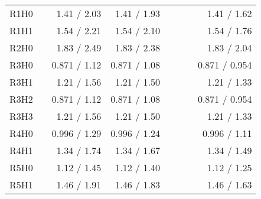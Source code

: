 \begin{table}[hb]
\begin{centering}
{\begin{tabular}{|l|l|r|r|r|r|r|r|}
R1H0                            &                                                                       &    1.41 / 2.03 &   1.41 / 1.93 &               &               &               &   1.41 / 1.62 \\
R1H1                            &                                                                       &    1.54 / 2.21 &   1.54 / 2.10 &               &               &               &   1.54 / 1.76 \\
R2H0                            &                                                                       &    1.83 / 2.49 &   1.83 / 2.38 &               &               &               &   1.83 / 2.04 \\
R3H0                            &                                                                       &   0.871 / 1.12 &  0.871 / 1.08 &               &               &               & 0.871 / 0.954 \\
R3H1                            &                                                                       &    1.21 / 1.56 &   1.21 / 1.50 &               &               &               &   1.21 / 1.33 \\
R3H2                            &                                                                       &   0.871 / 1.12 &  0.871 / 1.08 &               &               &               & 0.871 / 0.954 \\
R3H3                            &                                                                       &    1.21 / 1.56 &   1.21 / 1.50 &               &               &               &   1.21 / 1.33 \\
R4H0                            &                                                                       &   0.996 / 1.29 &  0.996 / 1.24 &               &               &               &  0.996 / 1.11 \\
R4H1                            &                                                                       &    1.34 / 1.74 &   1.34 / 1.67 &               &               &               &   1.34 / 1.49 \\
R5H0                            &                                                                       &    1.12 / 1.45 &   1.12 / 1.40 &               &               &               &   1.12 / 1.25 \\
R5H1                            &                                                                       &    1.46 / 1.91 &   1.46 / 1.83 &               &               &               &   1.46 / 1.63 \\ \hline

\end{tabular}}
\end{centering}
\end{table}
